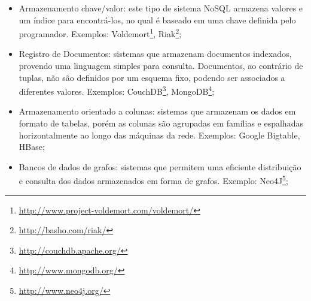 \begin{itemize}

  \item{Armazenamento chave/valor: este tipo de sistema NoSQL armazena valores e um índice para encontrá-los, no qual é baseado em uma chave definida pelo programador. Exemplos: Voldemort\footnote{\url{http://www.project-voldemort.com/voldemort/}}, Riak\footnote{\url{http://basho.com/riak/}};}
  \item{Registro de Documentos: sistemas que armazenam documentos indexados, provendo uma linguagem simples para consulta. Documentos, ao contrário de tuplas, não são definidos por um esquema fixo, podendo ser associados a diferentes valores. Exemplos: CouchDB\footnote{\url{http://couchdb.apache.org/}}, MongoDB\footnote{\url{http://www.mongodb.org/}};}
  \item{Armazenamento orientado a colunas: sistemas que armazenam os dados em formato de tabelas, porém as colunas são agrupadas em famílias e espalhadas horizontalmente ao longo das máquinas da rede. Exemplos: Google Bigtable, HBase;}
  \item{Bancos de dados de grafos: sistemas que permitem uma eficiente distribuição e consulta dos dados armazenados em forma de grafos. Exemplo: Neo4J\footnote{\url{http://www.neo4j.org/}};}

\end{itemize}








